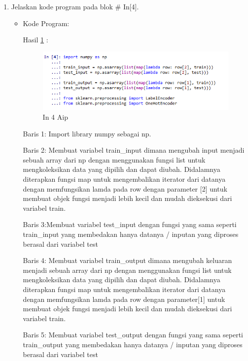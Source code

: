 \begin{enumerate}
\item Jelaskan kode program pada blok \# In[4].
\begin{itemize}
\item Kode Program:

\par Hasil \ref{in4aip} :
\begin{figure}[!hbtp]
\centering
\includegraphics[scale=0.7]{figures/AIP/prak4.PNG}
\caption{In 4 Aip}
\label{in4aip}
\end{figure}
\par Baris 1: Import library numpy sebagai np.
\par Baris 2: Membuat variabel train\_input dimana mengubah input menjadi sebuah array dari np dengan menggunakan fungsi list untuk mengkoleksikan data yang dipilih dan dapat diubah. Didalamnya diterapkan fungsi map untuk mengembalikan iterator dari datanya dengan memfungsikan lamda pada row dengan parameter [2] untuk membuat objek fungsi menjadi lebih kecil dan mudah dieksekusi dari variabel train.
\par Baris 3:Membuat variabel test\_input dengan fungsi yang sama seperti train\_input yang membedakan hanya datanya / inputan yang diproses berasal dari variabel test
\par Baris 4: Membuat variabel train\_output dimana mengubah keluaran menjadi sebuah array dari np dengan menggunakan fungsi list untuk mengkoleksikan data yang dipilih dan dapat diubah. Didalamnya diterapkan fungsi map untuk mengembalikan iterator dari datanya dengan memfungsikan lamda pada row dengan parameter[1] untuk membuat objek fungsi menjadi lebih kecil dan mudah dieksekusi dari variabel train.
\par Baris 5: Membuat variabel test\_output dengan fungsi yang sama seperti train\_output yang membedakan hanya datanya / inputan yang diproses berasal dari variabel test
\end{itemize}
\par


\end{enumerate}
